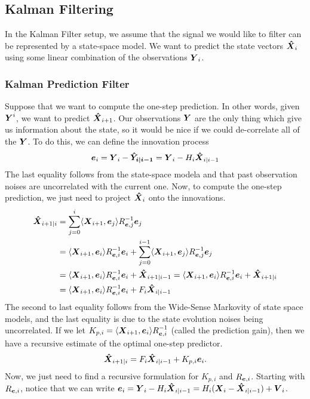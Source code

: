 \subsection{Kalman Filtering}
In the Kalman Filter setup, we assume that the signal we would like to filter can be represented by a state-space model.
We want to predict the state vectors $\boldsymbol{\hat{X}}_i$ using some linear combination of the observations $\boldsymbol{Y}_i$.
\subsubsection{Kalman Prediction Filter}
Suppose that we want to compute the one-step prediction.
In other words, given $\boldsymbol{Y}^i$, we want to predict $\boldsymbol{\hat{X}}_{i+1}$.
Our observations $\boldsymbol{Y}$ are the only thing which give us information about the state, so it would be nice if we could de-correlate all of the $\boldsymbol{Y}$.
To do this, we can define the innovation process \[
	\boldsymbol{e}_i = \boldsymbol{Y}_i - \boldsymbol{\hat{Y}_{i|i-1}} = \boldsymbol{Y}_i - H_i\boldsymbol{\hat{X}}_{i|i-1}
\]
The last equality follows from the state-space modela and that past observation noises are uncorrelated with the current one.
Now, to compute the one-step prediction, we just need to project $\boldsymbol{\hat{X}}_i$ onto the innovations.
\begin{align*}
	\boldsymbol{\hat{X}}_{i+1|i} &= \sum_{j=0}^i\langle \boldsymbol{X}_{i+1}, \boldsymbol{e}_j \rangle R_{\boldsymbol{e},j}^{-1}\boldsymbol{e}_j \\
	&= \langle \boldsymbol{X}_{i+1}, \boldsymbol{e}_{i} \rangle R_{\boldsymbol{e},i}^{-1}\boldsymbol{e}_i + \sum_{j=0}^{i-1}\langle \boldsymbol{X}_{i+1}, \boldsymbol{e}_j \rangle R_{\boldsymbol{e},j}^{-1}\boldsymbol{e}_j\\
	&= \langle \boldsymbol{X}_{i+1}, \boldsymbol{e}_{i} \rangle R_{\boldsymbol{e},i}^{-1}\boldsymbol{e}_i + \boldsymbol{\hat{X}}_{i+1|i-1} = \langle \boldsymbol{X}_{i+1}, \boldsymbol{e}_{i} \rangle R_{\boldsymbol{e},i}^{-1}\boldsymbol{e}_i + \boldsymbol{\hat{X}}_{i+1|i}\\
	&= \langle \boldsymbol{X}_{i+1}, \boldsymbol{e}_{i} \rangle R_{\boldsymbol{e},i}^{-1}\boldsymbol{e}_i + F_i\boldsymbol{\hat{X}}_{i|i-1}
\end{align*}
The second to last equality follows from the Wide-Sense Markovity of state space models, and the last equality is due to the state evolution noises being uncorrelated.
If we let $K_{p,i} = \langle \boldsymbol{X}_{i+1}, \boldsymbol{e}_i \rangle R_{\boldsymbol{e},i}^{-1}$ (called the prediction gain), then we have a recursive estimate of the optimal one-step predictor.
\[
	\boldsymbol{\hat{X}}_{i+1|i} = F_i\boldsymbol{\hat{X}}_{i|i-1} + K_{p,i}\boldsymbol{e}_i.
\]
Now, we just need to find a recursive formulation for $K_{p,i}$ and $R_{\boldsymbol{e},i}$.
Starting with $R_{\boldsymbol{e},i}$, notice that we can write $\boldsymbol{e}_i = \boldsymbol{Y}_i-H_i\boldsymbol{\hat{X}}_{i|i-1} = H_i(\boldsymbol{X}_i-\boldsymbol{\hat{X}}_{i|i-1})+\boldsymbol{V}_i$.
